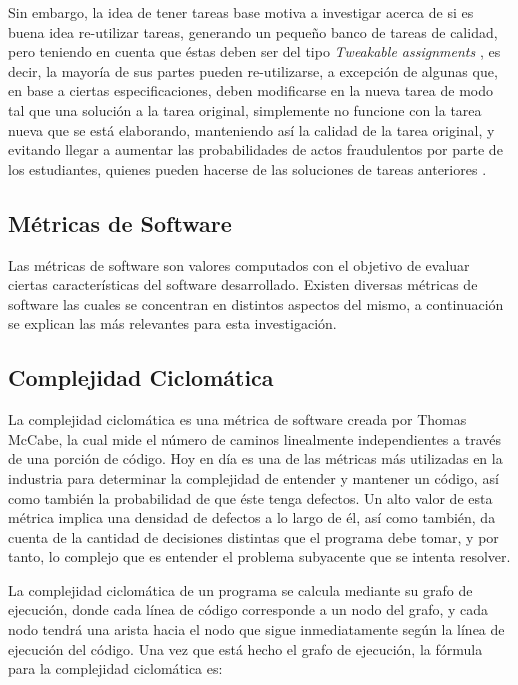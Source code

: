 \documentclass[letterpaper,12pt]{article}
\begin{document}
Sin embargo, la idea de tener tareas base motiva a investigar acerca de si es buena idea re-utilizar tareas, generando un pequeño banco de tareas de calidad, pero teniendo en cuenta que éstas deben ser del tipo \textit{Tweakable assignments} \cite{10.1145/3477429}, es decir, la mayoría de sus partes pueden re-utilizarse, a excepción de algunas que, en base a ciertas especificaciones, deben modificarse en la nueva tarea de modo tal que una solución a la tarea original, simplemente no funcione con la tarea nueva que se está elaborando, manteniendo así la calidad de la tarea original, y evitando llegar a aumentar las probabilidades de actos fraudulentos por parte de los estudiantes, quienes pueden hacerse de las soluciones de tareas anteriores \cite{10.1145/3013499.3013507}.

\subsection{Métricas de Software}

Las métricas de software son valores computados con el objetivo de evaluar ciertas características del software desarrollado\cite{1702275}. Existen diversas métricas de software las cuales se concentran en distintos aspectos del mismo, a continuación se explican las más relevantes para esta investigación.

\subsection{Complejidad Ciclomática}

La complejidad ciclomática es una métrica de software creada por Thomas McCabe, la cual mide el número de caminos linealmente independientes a través de una porción de código\cite{7725232}. Hoy en día es una de las métricas más utilizadas en la industria para determinar la complejidad de entender y mantener un código, así como también la probabilidad de que éste tenga defectos. Un alto valor de esta métrica implica una densidad de defectos a lo largo de él, así como también, da cuenta de la cantidad de decisiones distintas que el programa debe tomar, y por tanto, lo complejo que es entender el problema subyacente que se intenta resolver.

La complejidad ciclomática de un programa se calcula mediante su grafo de ejecución, donde cada línea de código corresponde a un nodo del grafo, y cada nodo tendrá una arista hacia el nodo que sigue inmediatamente según la línea de ejecución del código. Una vez que está hecho el grafo de ejecución, la fórmula para la complejidad ciclomática es:
\end{document}
